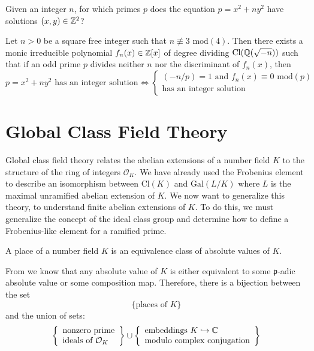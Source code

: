 Given an integer $n$, for which primes $p$ does the equation $p = x^2 + ny^2$ have solutions $(x,y) \in \mathbb{Z}^2$?

\begin{theorem}
    Let $n>0$ be a square free integer such that $n \not\equiv 3 \textrm{ mod}(4)$. Then there exists a monic irreducible polynomial $f_n(x) \in \mathbb{Z}[x]$ of degree dividing $\textrm{Cl}(\mathbb{Q}(\sqrt{-n}))$ such that if an odd prime $p$ divides neither $n$ nor the discriminant of $f_n(x)$, then
        \[p = x^2 + ny^2 \textrm{ has an integer solution} \iff \begin{cases}
            (-n/p) = 1 \textrm{ and } f_n(x)\equiv 0 \textrm{ mod}(p)\\
            \textrm{has an integer solution}
        \end{cases}\]
\end{theorem}


\section{Global Class Field Theory}

Global class field theory relates the abelian extensions of a number field $K$ to the structure of the ring of integers $\mathcal{O}_{K}$. We have already used the Frobenius element to describe an isomorphism between $\textrm{Cl}(K)$ and $\textrm{Gal}(L/K)$ where $L$ is the maximal unramified abelian extension of $K$. We now want to generalize this theory, to understand finite abelian extensions of $K$. To do this, we must generalize the concept of the ideal class group and determine how to define a Frobenius-like element for a ramified prime.

\begin{definition}[Place]
    A place of a number field $K$ is an equivalence class of absolute values of $K$.
\end{definition}

From  we know that any absolute value of $K$ is either equivalent to some $\mathfrak{p}$-adic absolute value or some composition map. Therefore, there is a bijection between the set
    \[\{\textrm{places of $K$}\}\]
and the union of sets:
\[\left\{\begin{array}{l}
    \textrm{nonzero prime}\\
    \textrm{ideals of $\mathcal{O}_{K}$}
\end{array}\right\} \cup
\left\{\begin{array}{l}
    \textrm{embeddings $K \hookrightarrow \mathbb{C}$}\\
    \textrm{modulo complex conjugation}
\end{array}\right\}
\]

